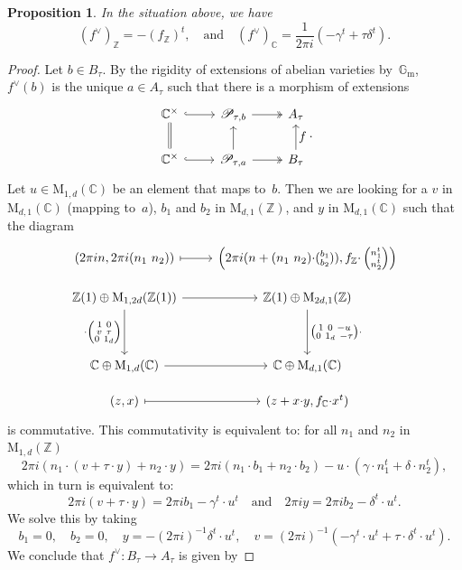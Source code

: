 \documentclass[JEP,XML,SOM,Unicode,NoFloatCountersInSection]{cedram}
\let\mathcal\mathscr
\let\oldvee\vee
\renewcommand{\vee}{{\scriptscriptstyle\oldvee}}
\theoremstyle{plain}
\newtheorem{Proposition}[subsection]{Proposition}
\theoremstyle{definition}
\numberwithin{equation}{subsection}
\renewcommand{\C}{\mathbb C}
\newcommand{\Z}{\mathbb Z}
\renewcommand{\G}{\mathbb G}
\newcommand{\calP}{\mathcal{P}}
\newcommand{\Gm}{\G_{\mathrm{m}}}
\newcommand{\rmM}{\mathrm{M}}
\begin{document}
\begin{Proposition}\label{prop:symm_on_Z}
In the situation above, we have
\[
(f^\vee)_\Z = -(f_\Z)^t, \quad \text{and} \quad
(f^\vee)_\C = \frac{1}{2\pi i}(-\gamma^t+\tau\delta^t).
\]
\end{Proposition}
\begin{proof}
Let $b\in B_\tau$. By the rigidity of extensions of abelian varieties
by~$\Gm$, $f^\vee(b)$ is the unique $a\in A_\tau$ such
that there is a morphism of extensions
\[
\begin{tikzcd}
\C^\times \ar[d, equal] \ar[r, hook] & \calP_{\tau,b} \ar[r, two heads] & A_\tau \\
\C^\times \ar[r, hook] & \calP_{\tau,a} \ar[r, two heads] \ar[u] &
B_\tau \ar[u, "\textstyle f"']
\end{tikzcd}.
\]
Let $u\in\rmM_{1,d}(\C)$ be an element that maps to~$b$. Then we are
looking for a $v$ in $\rmM_{d,1}(\C)$ (mapping to~$a$), $b_1$ and
$b_2$ in $\rmM_{d,1}(\Z)$, and $y$ in $\rmM_{d,1}(\C)$ such that the
diagram
\[
\begin{tikzcd}
(2\pi i n, 2\pi i(n_1\ n_2)) \ar[r, mapsto]
& \left(2\pi i (n + (n_1\ n_2){\cdot}(\substack{b_1\\ b_2})),
f_\Z{\cdot}\left(\substack{n_1^t\\ n_2^t}\right)\right) \\[-8pt]
\Z(1) \oplus \rmM_{1,2d}(\Z(1)) \ar[r]
\ar[dd,"{\cdot}\left(
\substack{1\ 0\\ v\ \tau\\ 0\ 1_d}\right)"']
& \Z(1) \oplus \rmM_{2d,1}(\Z)
\ar[dd, "\left(\substack{1\ 0\ -u\\ 0\ 1_d\ -\tau}\right){\cdot}"]\\ \\
\C \oplus \rmM_{1,d}(\C) \ar[r] & \C \oplus \rmM_{d,1}(\C) \\[-8pt]
(z,x) \ar[r,mapsto] & (z+x{\cdot}y, f_\C{\cdot}x^t)
\end{tikzcd}
\]
is commutative. This commutativity is equivalent to: for all
$n_1$ and $n_2$ in $\rmM_{1,d}(\Z)$
\[
2\pi i (n_1{\cdot}(v+\tau{\cdot}y) + n_2{\cdot}y) =
2\pi i (n_1{\cdot}b_1+n_2{\cdot}b_2) -u{\cdot}(\gamma{\cdot} n_1^t + \delta{\cdot} n_2^t),
\]
which in turn is equivalent to:
\[
2\pi i (v+\tau{\cdot}y) = 2\pi i b_1 -\gamma^t{\cdot}u^t
\quad\text{and}\quad
2\pi i y = 2\pi i b_2 -\delta^t{\cdot}u^t.
\]
We solve this by taking
\[
b_1=0,\quad b_2=0, \quad
y = -(2\pi i)^{-1}\delta^t{\cdot}u^t,\quad
v = (2\pi i)^{-1} (-\gamma^t{\cdot}u^t + \tau{\cdot}\delta^t{\cdot}u^t).
\]
We conclude that $f^\vee\colon B_\tau\to A_\tau$ is given by

\end{proof}
\end{document}
